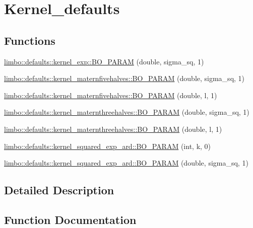 \hypertarget{group__kernel__defaults}{}\section{Kernel\+\_\+defaults}
\label{group__kernel__defaults}
\subsection*{Functions}
\begin{DoxyCompactItemize}
\item 
\hyperlink{group__kernel__defaults_ga202b52540fa68b47005cd9e3ef61a3fe}{limbo\+::defaults\+::kernel\+\_\+exp\+::\+B\+O\+\_\+\+P\+A\+R\+AM} (double, sigma\+\_\+sq, 1)
\item 
\hyperlink{group__kernel__defaults_ga001b0195485017f316c32002aba15139}{limbo\+::defaults\+::kernel\+\_\+maternfivehalves\+::\+B\+O\+\_\+\+P\+A\+R\+AM} (double, sigma\+\_\+sq, 1)
\item 
\hyperlink{group__kernel__defaults_gabc34e7cdebd3b2db4ffa355ac8eb51e9}{limbo\+::defaults\+::kernel\+\_\+maternfivehalves\+::\+B\+O\+\_\+\+P\+A\+R\+AM} (double, l, 1)
\item 
\hyperlink{group__kernel__defaults_ga76321c51e14ac1db904dd1411771e391}{limbo\+::defaults\+::kernel\+\_\+maternthreehalves\+::\+B\+O\+\_\+\+P\+A\+R\+AM} (double, sigma\+\_\+sq, 1)
\item 
\hyperlink{group__kernel__defaults_ga5e0b13e8fe6cc8b335d86ed94631225d}{limbo\+::defaults\+::kernel\+\_\+maternthreehalves\+::\+B\+O\+\_\+\+P\+A\+R\+AM} (double, l, 1)
\item 
\hyperlink{group__kernel__defaults_ga913157eccae4e432cb2fd43ec682773c}{limbo\+::defaults\+::kernel\+\_\+squared\+\_\+exp\+\_\+ard\+::\+B\+O\+\_\+\+P\+A\+R\+AM} (int, k, 0)
\item 
\hyperlink{group__kernel__defaults_ga5322933a812efe2019e375cd2b4875fc}{limbo\+::defaults\+::kernel\+\_\+squared\+\_\+exp\+\_\+ard\+::\+B\+O\+\_\+\+P\+A\+R\+AM} (double, sigma\+\_\+sq, 1)
\end{DoxyCompactItemize}


\subsection{Detailed Description}


\subsection{Function Documentation}
